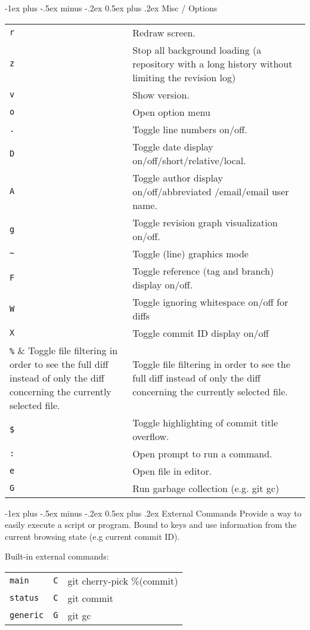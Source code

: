 \documentclass[10pt,landscape]{article}
\makeatletter
\renewcommand{\section}{\@startsection{section}{1}{0mm}%
                                {-1ex plus -.5ex minus -.2ex}%
                                {0.5ex plus .2ex}%
                                {\normalfont\large\bfseries}}
\makeatother
\begin{document}
\begin{multicols}{3}
\section{Misc / Options}
\begin{tabular}{@{}lp{6.5cm}@{}}
\verb!r! & Redraw screen. \\
\verb!z! & Stop all background loading (a repository with a long history without limiting the revision log) \\
\verb!v! & Show version. \\
\verb!o! & Open option menu \\
\verb!.! & Toggle line numbers on/off. \\
\verb!D! & Toggle date display on/off/short/relative/local. \\
\verb!A! & Toggle author display on/off/abbreviated /email/email user name. \\
\verb!g! & Toggle revision graph visualization on/off. \\
\verb!~! & Toggle (line) graphics mode \\
\verb!F! & Toggle reference (tag and branch) display on/off. \\
\verb!W! & Toggle ignoring whitespace on/off for diffs \\
\verb!X! & Toggle commit ID display on/off \\
\verb!%! & Toggle file filtering in order to see the full diff instead of only the diff concerning the currently selected file. \\
\verb!$! & Toggle highlighting of commit title overflow. \\
\verb!:! & Open prompt to run a command. \\
\verb!e! & Open file in editor. \\
\verb!G! & Run garbage collection (e.g. git gc) \\
\end{tabular}

\section{External Commands}
Provide a way to easily execute a script or program.
Bound to keys and use information from the current browsing state (e.g current commit ID).

Built-in external commands:
\begin{tabular}{@{}lll@{}}
\verb!main! & \verb!C! & git cherry-pick  \%(commit)\\
\verb!status! & \verb!C! & git commit \\
\verb!generic! & \verb!G! & git gc \\
\end{tabular}



\end{multicols}
\end{document}

